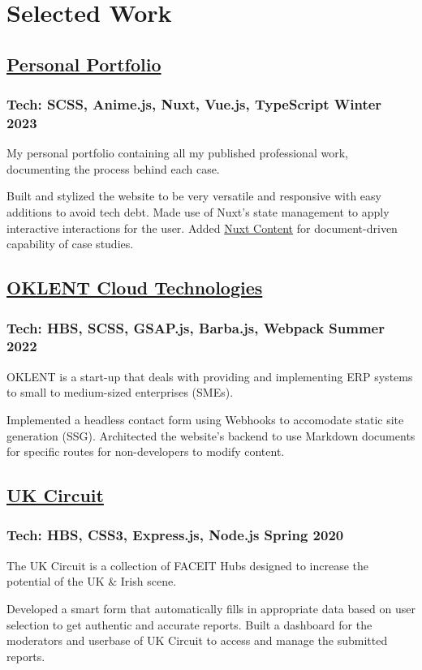 \section*{Selected Work}
%
%
%
%
%
%
\subsection*{
	\href{https://bumbleboss.xyz/}{Personal Portfolio}
}
\subsubsection*{
	Tech: SCSS, Anime.js, Nuxt, Vue.js, TypeScript
	\hspace*{\fill}
	Winter 2023
}
My personal portfolio containing all my published professional work, documenting the
process behind each case.
\vspace{2mm}
\begin{tasks}
	\task Built and stylized the website to be very versatile and responsive with easy
	additions to avoid tech debt.
	\task Made use of Nuxt's state management to apply interactive interactions for
	the user.
	\task Added \href{https://content.nuxtjs.org/}{Nuxt Content} for document-driven
	capability of case studies.
\end{tasks}
%
%
%
%
\subsection*{
	\href{https://oklent.com/}{OKLENT Cloud Technologies}
}
\subsubsection*{
	Tech: HBS, SCSS, GSAP.js, Barba.js, Webpack
	\hspace*{\fill}
	Summer 2022
}
OKLENT is a start-up that deals with providing and implementing ERP systems
to small to medium-sized enterprises (SMEs).
\vspace{2mm}
\begin{tasks}
	\task Implemented a headless contact form using Webhooks to accomodate static
	site generation (SSG).
	\task Architected the website’s backend to use Markdown documents for
	specific routes for non-developers to modify content.
\end{tasks}
%
%
%
%
\subsection*{
	\href{https://bumbleboss.xyz/w/uk-circuit}{UK Circuit}
}
\subsubsection*{
	Tech: HBS, CSS3, Express.js, Node.js
	\hspace*{\fill}
	Spring 2020
}
The UK Circuit is a collection of FACEIT Hubs designed to increase the potential of the
UK \& Irish scene.
\begin{tasks}
	\task Developed a smart form that automatically fills in appropriate data based on
	user selection to get authentic and accurate reports.
	\task Built a dashboard for the moderators and userbase of UK Circuit to access and manage
	the submitted reports.
\end{tasks}
%
%
%
%

